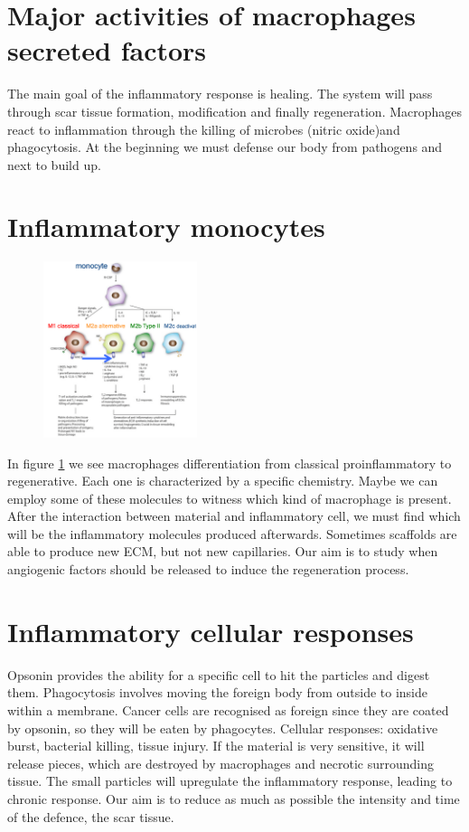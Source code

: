 \section{Major activities of macrophages secreted factors}
The main goal of the inflammatory response is healing.
The system will pass through scar tissue formation, modification and finally regeneration. Macrophages react to inflammation through the killing of microbes (nitric oxide)and phagocytosis.
At the beginning we must defense our body from pathogens and next to build up.

\section{Inflammatory monocytes}
\begin{figure}[ht]
\centering
\includegraphics[width=0.4\textwidth]{mono_diff}
\caption{\label{fig:mono}}
\end{figure}

\noindent
In figure \ref{fig:mono} we see macrophages differentiation from classical proinflammatory to regenerative.
Each one is characterized by a specific chemistry.
Maybe we can employ some of these molecules to witness which kind of macrophage is present. After the interaction between material and inflammatory cell, we must find which will be the inflammatory molecules produced afterwards.
Sometimes scaffolds are able to produce new ECM, but not new capillaries.
Our aim is to study when angiogenic factors should be released to induce the regeneration process.

\section{Inflammatory cellular responses}
Opsonin provides the ability for a specific cell to hit the particles and digest them. Phagocytosis involves moving the foreign body from outside to inside within a membrane.
Cancer cells are recognised as foreign since they are coated by opsonin, so they will be eaten by phagocytes.
Cellular responses: oxidative burst, bacterial killing, tissue injury.
If the material is very sensitive, it will release pieces, which are destroyed by macrophages and necrotic surrounding tissue.
The small particles will upregulate the inflammatory response, leading to chronic response.
Our aim is to reduce as much as possible the intensity and time of the defence, the scar tissue.


